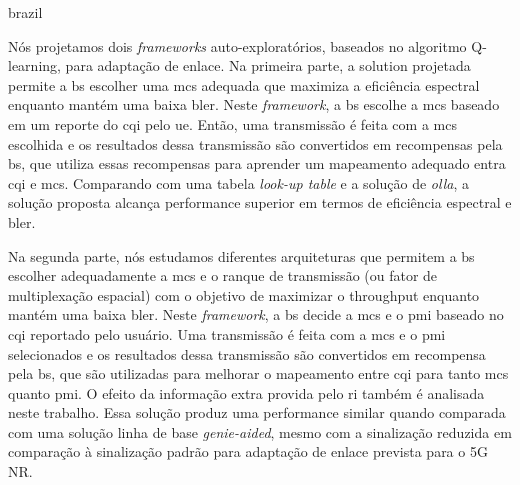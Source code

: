 \begin{resumo}[Resumo]
\begin{otherlanguage*}{brazil}

\setlength\parindent{24pt}
Nós projetamos dois \textit{frameworks} auto-exploratórios, baseados no algoritmo Q-learning, para adaptação de enlace.
%
Na primeira parte, a solution projetada permite a \gls{bs} escolher uma \gls{mcs} adequada que maximiza a eficiência espectral enquanto mantém uma baixa \gls{bler}.
%
Neste \textit{framework}, a \gls{bs} escolhe a \gls{mcs} baseado em um reporte do \gls{cqi} pelo \gls{ue}.
%
Então, uma transmissão é feita com a \gls{mcs} escolhida e os resultados dessa transmissão são convertidos em recompensas pela \gls{bs}, que utiliza essas recompensas para aprender um mapeamento adequado entra \gls{cqi} e \gls{mcs}.
%
Comparando com uma tabela \textit{look-up table} e a solução de \textit{\gls{olla}}, a solução proposta alcança performance superior em termos de eficiência espectral e \gls{bler}.

Na segunda parte, nós estudamos diferentes arquiteturas que permitem a \gls{bs} escolher adequadamente a \gls{mcs} e o ranque de transmissão (ou fator de multiplexação espacial) com o objetivo de maximizar o throughput enquanto mantém uma baixa \gls{bler}.
%
Neste \textit{framework}, a \gls{bs} decide a \gls{mcs} e o \gls{pmi} baseado no \gls{cqi} reportado pelo usuário.
%
Uma transmissão é feita com a \gls{mcs} e o \gls{pmi} selecionados e os resultados dessa transmissão são convertidos em recompensa pela \gls{bs}, que são utilizadas para melhorar o mapeamento entre \gls{cqi} para tanto \gls{mcs} quanto \gls{pmi}.
%
O efeito da informação extra provida pelo \gls{ri} também é analisada neste trabalho.
%
Essa solução produz uma performance similar quando comparada com uma solução linha de base \textit{genie-aided}, mesmo com a sinalização reduzida em comparação à sinalização padrão para adaptação de enlace prevista para o 5G NR.


\end{otherlanguage*}
\end{resumo}
